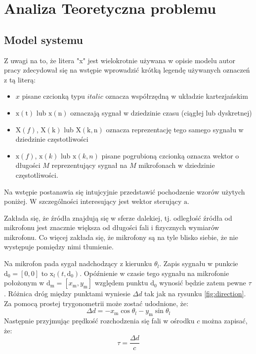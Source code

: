 \chapter{Analiza Teoretyczna problemu}
\label{chapter-2}
\section{Model systemu}

Z uwagi na to, że litera "x" jest wielokrotnie używana w opisie modelu autor pracy zdecydował się na wstępie wprowadzić krótką legendę używanych oznaczeń z tą literą:
\begin{itemize}
    \item $x$ pisane czcionką typu $italic$ oznacza współrzędną w układzie kartezjańskim
    \item $\mathrm{x(t)}$ lub $\mathrm{x(n)}$ oznaczają sygnał w dziedzinie czasu (ciągłej lub dyskretnej)
    \item $\mathrm{X}(f)$, $\mathrm{X(k)}$ lub $\mathrm{X(k,n)}$ oznacza reprezentację tego samego sygnału w dziedzinie częstotliwości
    \item $\bm{\mathrm{x}}(f)$, $\bm{\mathrm{x}}(k)$ lub $\bm{\mathrm{x}}(k,n)$ pisane pogrubioną czcionką oznacza wektor o długości $M$ reprezentujący sygnał na $M$ mikrofonach w dziedzinie częstotliwości.
\end{itemize}


\noindent Na wstępie postanawia się intujcyjnie przedstawić pochodzenie wzorów użytych poniżej. W szczególności interesujący jest wektor sterujący $\bm{\mathrm{a}}$.

\noindent Zakłada się, że źródła znajdują się w sferze dalekiej, tj. odległość źródła od mikrofonu jest znacznie większa od długości fali i fizycznych wymiarów mikrofonu. Co więcej zakłada się, że mikrofony są na tyle blisko siebie, że nie występuje pomiędzy nimi tłumienie.

\noindent Na mikrofon pada sygał nadchodzący z kierunku $\theta_{l}$.
Zapis sygnału w punkcie $\bm{\mathrm{d}}_{0} = [0,0]$ to $\mathrm{x}_{l}(t,\bm{\mathrm{d}}_{0})$. Opóźnienie w czasie tego sygnału na mikrofonie położonym w $\bm{\mathrm{d}}_{\mathrm{m}} = [x_{\mathrm{m}},y_{\mathrm{m}}]$ względem punktu $\bm{\mathrm{d}}_{0}$ wynosić będzie zatem pewne $\tau$. Różnica dróg między punktami wyniesie $\Delta d$ tak jak na rysunku \ref{fig:direction}. Za pomocą prostej trygonometrii może zostać udodnione, że:
\begin{equation}
    \label{equation:2.4}
    \Delta d = -x_{\mathrm{m}}\cos{\theta_{l}} - y_{\mathrm{m}}\sin{\theta_{l}}
\end{equation}
Następnie przyjmując prędkość rozchodzenia się fali w ośrodku $c$ można zapisać, że:
\begin{equation}
    \label{equation:2.5}
    \tau = \dfrac{\Delta d}{c}
\end{equation}

